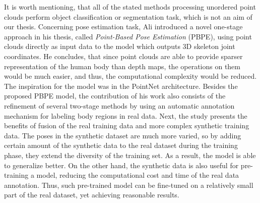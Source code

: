 \noindent It is worth mentioning, that all of the stated methods processing unordered point clouds perform object classification or segmentation task, which is not an aim of our thesis. Concerning pose estimation task, Ali \cite{Ali19} introduced a novel one-stage approach in his thesis, called \textit{Point-Based Pose Estimation} (PBPE), using point clouds directly as input data to the model which outputs 3D skeleton joint coordinates. He concludes, that since point clouds are able to provide sparser representation of the human body than depth maps, the operations on them would be much easier, and thus, the computational complexity would be reduced. The inspiration for the model was in the PointNet architecture. Besides the proposed PBPE model, the contribution of his work also consists of the refinement of several two-stage methods by using an automatic annotation mechanism for labeling body regions in real data. Next, the study presents the benefits of fusion of the real training data and more complex synthetic training data. The poses in the synthetic dataset are much more varied, so by adding certain amount of the synthetic data to the real dataset during the training phase, they extend the diversity of the training set. As a result, the model is able to generalize better. On the other hand, the synthetic data is also useful for pre-training a model, reducing the computational cost and time of the real data annotation. Thus, such pre-trained model can be fine-tuned on a relatively small part of the real dataset, yet achieving reasonable results. \par





